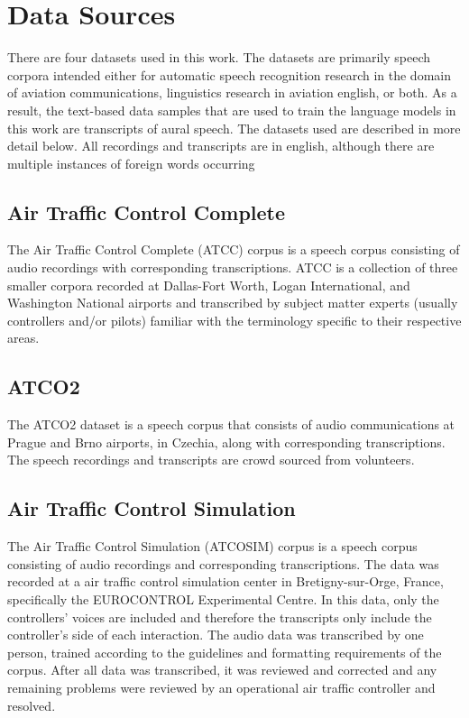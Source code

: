 \documentclass[12pt]{article}
\begin{document}
\section{Data Sources}\label{sec:data_source}
There are four datasets used in this work. The datasets are primarily speech corpora intended either for automatic speech recognition
research in the domain of aviation communications, linguistics research in aviation english, or both. As a result, the text-based data
samples that are used to train the language models in this work are transcripts of aural speech. The datasets used are described in more
detail below. All recordings and transcripts are in english, although there are multiple instances of foreign words occurring

\subsection{Air Traffic Control Complete}\label{sec:atcc}
The Air Traffic Control Complete (ATCC) corpus is a speech corpus consisting of audio recordings with corresponding transcriptions.
ATCC is a collection of three smaller corpora recorded at Dallas-Fort Worth, Logan International, and Washington National airports and
transcribed by subject matter experts (usually controllers and/or pilots) familiar with the terminology specific to their respective
areas\cite{godfrey_air_1994}.

\subsection{ATCO2}\label{sec:atco2}
The ATCO2 dataset is a speech corpus that consists of audio communications at Prague and Brno airports, in Czechia, along with corresponding
transcriptions. The speech recordings and transcripts are crowd sourced from volunteers\cite{szoke_detecting_2021}.


\subsection{Air Traffic Control Simulation}\label{sec:atcosim}
The Air Traffic Control Simulation (ATCOSIM) corpus is a speech corpus consisting of audio recordings and corresponding transcriptions.
The data was recorded at a air traffic control simulation center in Bretigny-sur-Orge, France, specifically the EUROCONTROL Experimental Centre.
In this data, only the controllers' voices are included and therefore the transcripts only include the controller's side of each interaction.
The audio data was transcribed by one person, trained according to the guidelines and formatting requirements of the corpus. After all data was
transcribed, it was reviewed and corrected and any remaining problems were reviewed by an operational air traffic controller and
resolved\cite{hofbauer_atcosim_2008}.
\end{document}
